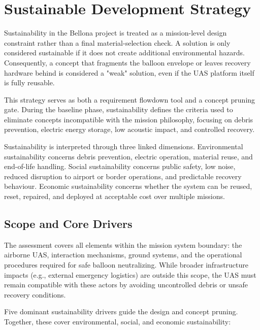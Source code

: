 \vspace{-15pt}
\chapter{Sustainable Development Strategy}
\label{ch:sustainability}

Sustainability in the Bellona project is treated as a mission-level design constraint rather than a final material-selection check. A solution is only considered sustainable if it does not create additional environmental hazards. Consequently, a concept that fragments the balloon envelope or leaves recovery hardware behind is considered a "weak" solution, even if the UAS platform itself is fully reusable.

This strategy serves as both a requirement flowdown tool and a concept pruning gate. During the baseline phase, sustainability defines the criteria used to eliminate concepts incompatible with the mission philosophy, focusing on debris prevention, electric energy storage, low acoustic impact, and controlled recovery.

Sustainability is interpreted through three linked dimensions. Environmental sustainability concerns debris prevention, electric operation, material reuse, and end-of-life handling. Social sustainability concerns public safety, low noise, reduced disruption to airport or border operations, and predictable recovery behaviour. Economic sustainability concerns whether the system can be reused, reset, repaired, and deployed at acceptable cost over multiple missions.
\vspace{-12pt}
\section{Scope and Core Drivers}
The assessment covers all elements within the mission system boundary: the airborne UAS, interaction mechanisms, ground systems, and the operational procedures required for safe balloon neutralizing. While broader infrastructure impacts (e.g., external emergency logistics) are outside this scope, the UAS must remain compatible with these actors by avoiding uncontrolled debris or unsafe recovery conditions.

Five dominant sustainability drivers guide the design and concept pruning. Together, these cover environmental, social, and economic sustainability:

